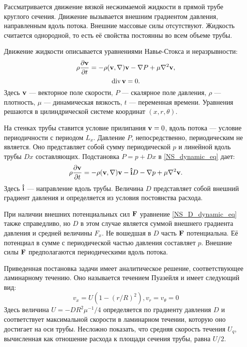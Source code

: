 
Рассматривается движение вязкой несжимаемой жидкости в прямой трубе круглого сечения. Движение вызывается внешним градиентом давления, направленным вдоль потока. Внешние массовые силы отсутствуют. Жидкость считается однородной, то есть её свойства постоянны во всем объеме трубы. 


Движение жидкости описывается уравнениями Навье-Стокса и неразрывности:
\begin{equation}\label{NS_dynamic_eq}
\rho\frac{\partial \mathbf{v}}{\partial t} = - \rho (\mathbf{v}, \nabla) \mathbf{v} - \nabla P + \mu \nabla^2 \mathbf{v},
\end{equation}
\begin{equation}\label{incompres_eq}
\operatorname{div} \mathbf{v} = 0. 
\end{equation}
Здесь $\mathbf{v}$ --- векторное поле скорости, $P$ ---  скалярное поле давления, $\rho$ --- плотность, $\mu$ --- динамическая вязкость, $t$ --- переменная времени. Уравнения решаются в цилиндрической системе координат $(x,r,\theta)$.


На стенках трубы ставится условие прилипания $\mathbf{v} = 0$, вдоль потока --- условие периодичности с периодом $L_x$. Давление $P$, непосредственно, периодическим не является. Оно представляет собой сумму периодической $p$ и линейной вдоль трубы $Dx$ составляющих. Подстановка $P = p + Dx$ в \eqref{NS_dynamic_eq} дает:
\begin{equation}\label{NS_D_dynamic_eq}
\rho \frac{\partial \mathbf{v}}{\partial t} =  - \rho (\mathbf{v}, \nabla) \mathbf{v} - \mathbf{\hat{i}} D - \nabla p + \mu \nabla^2 \mathbf{v}.
\end{equation}
Здесь $\mathbf{\hat{i}}$ --- направление вдоль трубы. Величина $D$ представляет собой внешний градиент давления и определяется из условия постоянства расхода. 


При наличии внешних потенциальных сил $\mathbf{F}$ уравнение \eqref{NS_D_dynamic_eq} также справедливо, но $D$ в этом случае является суммой внешнего градиента давления и средней величины $F_x$. Не вошедшая в $D$ часть $\mathbf{F}$ потенциальна. Её потенциал в сумме с периодической частью давления составляет $p$. Внешние силы $\mathbf{F}$ предполагаются периодическими вдоль потока.


Приведенная постановка задачи имеет аналитическое решение, соответствующее ламинарному течению. Оно называется течением Пуазейля и имеет следующий вид:
\begin{equation}
v_x = U (1 - (r / R)^2), 
v_r = v_\theta = 0
\end{equation}
Здесь величина $U = - D R^2\mu^{-1}/4 $ определяется по градиенту давления $D$ и соответствует максимальной скорости в ламинарном течении, которую оно достигает на оси трубы. Несложно показать, что средняя скорость течения $U_q$, вычисленная как отношение расхода к площади сечения трубы, равна $U/2$. 


